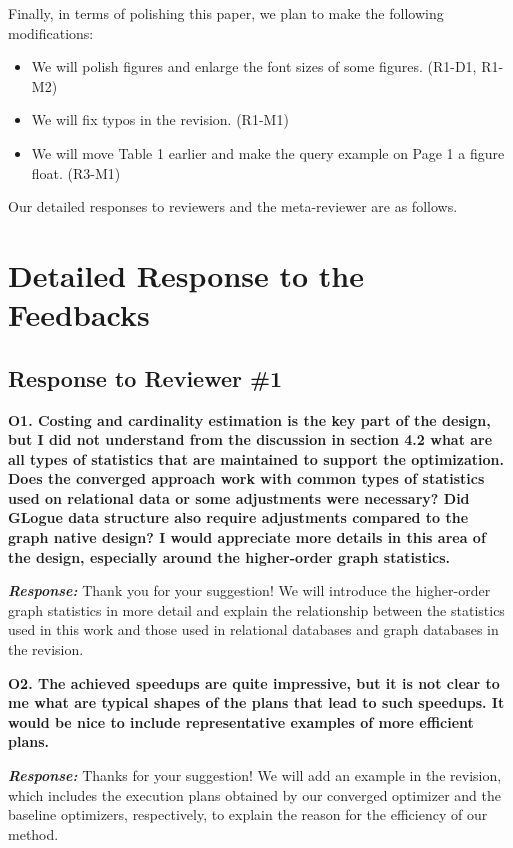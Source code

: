 Finally, in terms of polishing this paper, we plan to make the following modifications:
\begin{itemize}
    \item We will polish figures and enlarge the font sizes of some figures. (R1-D1, R1-M2)
    \item We will fix typos in the revision. (R1-M1)
    \item We will move Table 1 earlier and make the query example on Page 1 a figure float. (R3-M1)
\end{itemize}

Our detailed responses to reviewers and the meta-reviewer are as follows.


\section{Detailed Response to the Feedbacks}
\subsection{Response to Reviewer \#1}

\textbf{O1. Costing and cardinality estimation is the key part of the design, but I did not understand from the discussion in section 4.2 what are all types of statistics that are maintained to support the optimization. Does the converged approach work with common types of statistics used on relational data or some adjustments were necessary? Did GLogue data structure also require adjustments compared to the graph native design? I would appreciate more details in this area of the design, especially around the higher-order graph statistics.}

\begin{mdframed}[linewidth=0.5pt, linecolor=black]
\textbf{\textit{Response: }}
Thank you for your suggestion! We will introduce the higher-order graph statistics in more detail and explain the relationship between the statistics used in this work and those used in relational databases and graph databases in the revision.
\end{mdframed}



\textbf{O2. The achieved speedups are quite impressive, but it is not clear to me what are typical shapes of the plans that lead to such speedups. It would be nice to include representative examples of more efficient plans.}

\textbf{\textit{Response: }}
Thanks for your suggestion! We will add an example in the revision, which includes the execution plans obtained by our converged optimizer and the baseline optimizers, respectively, to explain the reason for the efficiency of our method.

